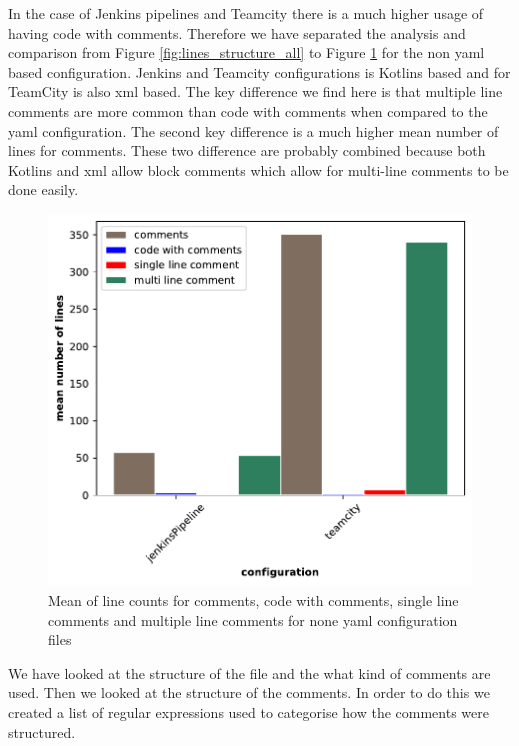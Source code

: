 \documentclass[10pt,conference]{IEEEtran}
\begin{document}
In the case of Jenkins pipelines and Teamcity there is a much higher usage of having code with comments. Therefore we have separated the analysis and comparison from Figure \ref{fig:lines_structure_all} to Figure \ref{fig:lines_structure_none_yaml} for the non yaml based configuration. Jenkins and Teamcity configurations is Kotlins based and for TeamCity is also xml based. The key difference we find here is that multiple line comments are more common than code with comments when compared to the yaml configuration. The second key difference is a much higher mean number of lines for comments. These two difference are probably combined because both Kotlins and xml allow block comments which allow for multi-line comments to be done easily. 
\begin{figure}[!ht]
  \centering
  \includegraphics[width=\textwidth]{../src/results/line structure none yaml comments.pdf}
  \caption[alt text]{Mean of line counts for comments, code with comments, single line comments and multiple line comments for none yaml configuration files}
  \label{fig:lines_structure_none_yaml}
\end{figure}

We have looked at the structure of the file and the what kind of comments are used. Then we looked at the structure of the comments. In order to do this we created a list of regular expressions used to categorise how the comments were structured. 
\end{document}
